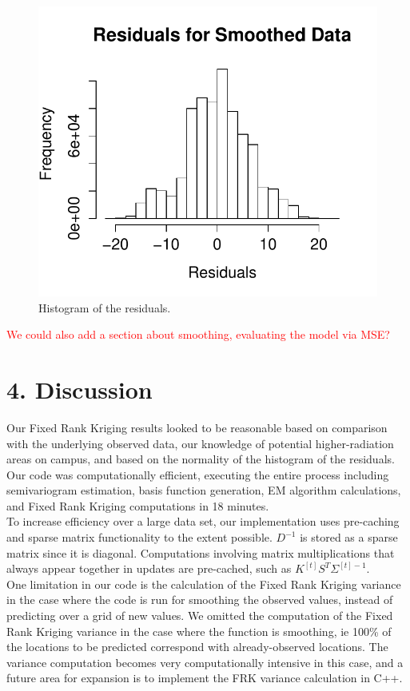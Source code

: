 \documentclass[11pt]{article}
\begin{document}
\begin{figure}[H]
\centering
\includegraphics[width=0.5\columnwidth]{Images/Residuals_for_smoothing}
\caption{Histogram of the residuals.}
\label{fig:10}
\end{figure}

\textcolor{red}{We could also add a section about smoothing, evaluating the model via MSE?}


\newpage
\section{4. Discussion}

Our Fixed Rank Kriging results looked to be reasonable based on comparison with the underlying observed data, our knowledge of potential higher-radiation areas on campus, and based on the normality of the histogram of the residuals.  Our code was computationally efficient, executing the entire process including semivariogram estimation, basis function generation, EM algorithm calculations, and Fixed Rank Kriging computations in 18 minutes.\\

To increase efficiency over a large data set, our implementation uses pre-caching and sparse matrix functionality to the extent possible.  $D^{-1}$ is stored as a sparse matrix since it is diagonal.  Computations involving matrix multiplications that always appear together in updates are pre-cached, such as $K^{[t]}S^T\Sigma^{[t]-1}$.\\

One limitation in our code is the calculation of the Fixed Rank Kriging variance in the case where the code is run for smoothing the observed values, instead of predicting over a grid of new values.  We omitted the computation of the Fixed Rank Kriging variance in the case where the function is smoothing, ie 100\% of the locations to be predicted correspond with already-observed locations.  The variance computation becomes very computationally intensive in this case, and a future area for expansion is to implement the FRK variance calculation in C++.\\
\end{document}
